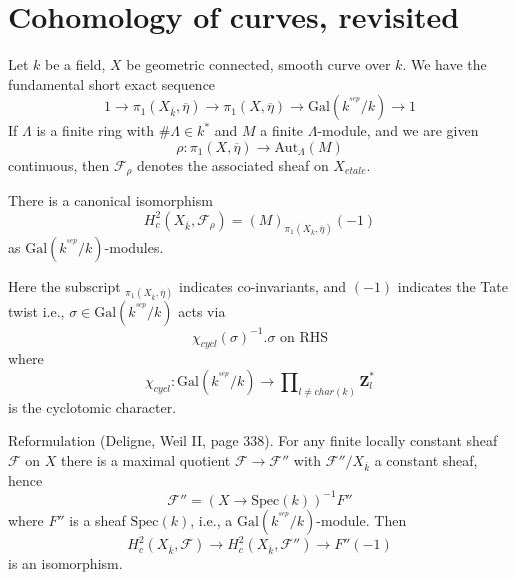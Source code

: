 \section{Cohomology of curves, revisited}
\label{section-cohomology-curves-revisited}

\noindent
Let $k$ be a field, $X$ be geometric connected, smooth curve over $k$.
We have the fundamental short exact sequence
$$
1 \to
\pi_1(X_{\overline k}, \overline \eta) \to
\pi_1(X, \overline\eta) \to
\text{Gal}(k^{^{sep}}/k) \to 1
$$
If $\Lambda$ is a finite ring with $\#\Lambda\in k^*$ and $M$ a finite
$\Lambda$-module, and we are given
$$
\rho:\pi_1(X, \overline\eta) \to \text{Aut}_{\Lambda}(M)
$$
continuous, then $\mathcal{F}_\rho$ denotes the associated sheaf on $X_{etale}$.

\begin{lemma}
\label{lemma-identify-h2c}
There is a canonical isomorphism
$$
H_c^2(X_{\overline k}, \mathcal{F}_\rho)=(M)_{\pi_1(X_{\overline k},
\overline\eta)}(-1)
$$
as $\text{Gal}(k^{^{sep}}/k)$-modules.
\end{lemma}

\noindent
Here the subscript ${}_{\pi_1(X_{\overline k}, \overline\eta)}$
indicates co-invariants, and $(-1)$ indicates the Tate twist i.e.,
$\sigma\in \text{Gal}(k^{^{sep}}/k)$ acts via
$$
\chi_{cycl}(\sigma)^{-1}.\sigma\text{ on RHS}
$$
where
$$
\chi_{cycl} :
\text{Gal}(k^{^{sep}}/k)
\to
\prod\nolimits_{l\neq char(k)}\mathbf{Z}_l^*
$$
is the cyclotomic character.

\medskip\noindent
Reformulation (Deligne, Weil II, page 338). For any finite locally
constant sheaf $\mathcal{F}$ on $X$ there is a maximal quotient $\mathcal{F}\to
\mathcal{F}''$ with $\mathcal{F}''/X_{\overline k}$ a constant sheaf, hence
$$
\mathcal{F}'' = (X\to \text{Spec}(k))^{-1}F''
$$
where $F''$ is a sheaf $\text{Spec}(k)$, i.e., a
$\text{Gal}(k^{^{sep}}/k)$-module. Then
$$
H_c^2(X_{\overline k}, \mathcal{F})\to H_c^2(X_{\overline k},
\mathcal{F}'')\to F''(-1)
$$
is an isomorphism.

